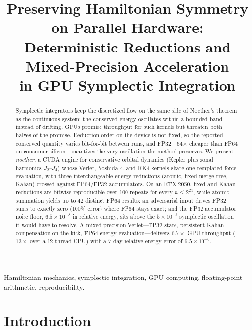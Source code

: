 \documentclass[conference]{IEEEtran}
\begin{document}
\title{Preserving Hamiltonian Symmetry on Parallel Hardware:\\
Deterministic Reductions and Mixed-Precision Acceleration\\in GPU Symplectic Integration}

\author{
}

\maketitle

\begin{abstract}
Symplectic integrators keep the discretized flow on the same side of
Noether's theorem as the continuous system: the conserved energy oscillates
within a bounded band instead of drifting. GPUs promise throughput for such
kernels but threaten both halves of the promise. Reduction order on the
device is not fixed, so the reported conserved quantity varies bit-for-bit
between runs, and FP32---64$\times$ cheaper than FP64 on consumer
silicon---quantizes the very oscillation the method preserves. We present
\textit{noether}, a CUDA engine for conservative orbital dynamics (Kepler
plus zonal harmonics $J_2$--$J_4$) whose Verlet, Yoshida-4, and RK4 kernels
share one templated force evaluation, with three interchangeable energy
reductions (atomic, fixed merge-tree, Kahan) crossed against FP64/FP32
accumulators. On an RTX 2050, fixed and Kahan reductions are bitwise
reproducible over 100 repeats for every $n \le 2^{24}$, while atomic
summation yields up to 42 distinct FP64 results; an adversarial input drives
FP32 sums to exactly zero (100\% error) where FP64 stays exact; and the
FP32 accumulator noise floor, $6.5\times10^{-8}$ in relative energy, sits
above the $5\times10^{-8}$ symplectic oscillation it would have to resolve.
A mixed-precision Verlet---FP32 state, persistent Kahan compensation on the
kick, FP64 energy evaluation---delivers $6.7\times$ GPU throughput
($13\times$ over a 12-thread CPU) with a 7-day relative energy error of
$6.5\times10^{-6}$.
\end{abstract}

\begin{IEEEkeywords}
Hamiltonian mechanics, symplectic integration, GPU computing, floating-point
arithmetic, reproducibility.
\end{IEEEkeywords}

\section{Introduction}
\label{sec:intro}
\end{document}
